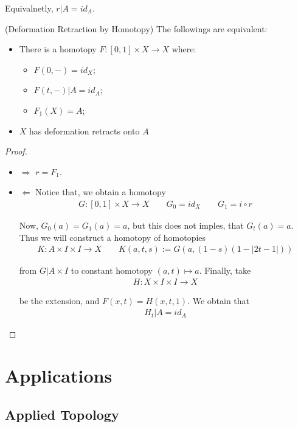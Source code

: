 \documentclass[Total.tex]{subfiles}
\begin{document}
			Equivalnetly, $r|A=id_A$. 
			
			\begin{proposition}
				(Deformation Retraction by Homotopy) The followings are equivalent:
				\begin{itemize}
					\item There is a homotopy $F:[0,1]\times X\rightarrow X$ where:
					\begin{itemize}
						\item $F(0,-)=id_X$;
						\item  $F(t,-)|A=id_A$;
						\item $F_1(X)=A$;
					\end{itemize}
					\item $X$ has deformation retracts onto $A$
				\end{itemize}
			\end{proposition}
			\begin{proof}
				\begin{itemize}
					\item $\Rightarrow$ $r=F_1$. 
					\item $\Leftarrow$ Notice that, we obtain a homotopy
					\begin{gather*}
						G:[0,1]\times X\rightarrow X\qquad G_0=id_X\qquad G_1=i\circ r
					\end{gather*}
					
					Now, $G_0(a)=G_1(a)=a$, but this does not imples, that $G_t(a)=a$. Thus we will construct a homotopy of homotopies
					\begin{gather*}
						K:A\times I\times I\rightarrow X\qquad K(a,t,s):=G(a,(1-s)(1-|2t-1|))
					\end{gather*}
					
					from $G|A\times I$ to constant homotopy $(a,t)\mapsto a$. Finally, take 
					\begin{gather*}
						H:X\times I\times I\rightarrow X
					\end{gather*}
					
					be the extension, and $F(x,t)=H(x,t,1)$. We obtain that
					\begin{gather*}
						H_t|A=id_A
					\end{gather*}
				\end{itemize}
			\end{proof}
	\chapter{Applications}
		\section{Applied Topology}
\end{document}

